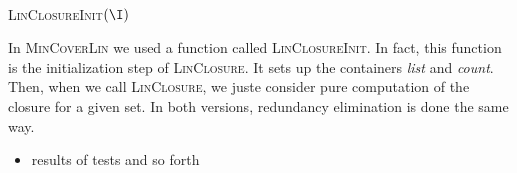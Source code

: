 \begin{minipage}[t]{0.4\textwidth}
	\begin{algorithm}[H]
		
		\BlankLine
		\BlankLine
		
		
		\BlankLine
		
	
		
		\label{alg:MinCoverClo}
	\end{algorithm}
\end{minipage}
~
\begin{minipage}[t]{0.4\textwidth}
	\begin{algorithm}[H]
		
		\BlankLine
		\BlankLine
		
		\textsc{LinClosureInit}$(\I)$ \;
		
		
		\BlankLine
		
	
		
		\label{alg:MinCoverLin}
	\end{algorithm}
\end{minipage}

\vspace{1.2em}

In \textsc{MinCoverLin} we used a function called \textsc{LinClosureInit}. In fact, this function is the initialization step of \textsc{LinClosure}. It sets up the containers \textit{list} and \textit{count}. Then, when we call \textsc{LinClosure}, we juste consider pure computation of the closure for a given set. In both versions, redundancy elimination is done the same way.

\begin{itemize}
	\item results of tests and so forth
\end{itemize}

